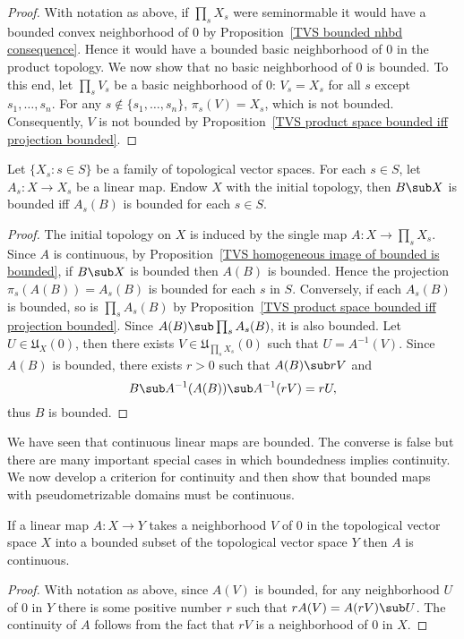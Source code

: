 \begin{proof}
With notation as above, if $\prod_sX_s$ were seminormable it would have a bounded convex neighborhood of $0$ by Proposition~\ref{TVS bounded nhbd consequence}. Hence it would have a bounded basic neighborhood of $0$ in the product topology. We now show that no basic neighborhood of $0$ is bounded. To this end, let $\prod_sV_s$ be a basic neighborhood of $0$: $V_s=X_s$ for all $s$ except $s_1,\dots,s_n$. For any $s\notin\{s_1,\dots,s_n\}$, $\pi_s(V)=X_s$, which is not bounded. Consequently, $V$ is not bounded by Proposition~\ref{TVS product space bounded iff projection bounded}.
\end{proof}
\begin{proposition}\label{TVS initial topo bounded iff}
Let $\{X_s:s\in S\}$ be a family of topological vector spaces. For each $s\in S$, let $A_s:X\to X_s$ be a linear map. Endow $X$ with the initial topology, then $B\sub X$ is bounded iff $A_s(B)$ is bounded for each $s\in S$.
\end{proposition}
\begin{proof}
The initial topology on $X$ is induced by the single map $A:X\to\prod_sX_s$. Since $A$ is continuous, by Proposition~\ref{TVS homogeneous image of bounded is bounded}, if $B\sub X$ is bounded then $A(B)$ is bounded. Hence the projection $\pi_s(A(B))=A_s(B)$ is bounded for each $s$ in $S$. Conversely, if each $A_s(B)$ is bounded, so is $\prod_sA_s(B)$ by Proposition~\ref{TVS product space bounded iff projection bounded}. Since $A(B)\sub\prod_sA_s(B)$, it is also bounded. Let $U\in\mathfrak{U}_X(0)$, then there exists $V\in\mathfrak{U}_{\prod_sX_s}(0)$ such that $U=A^{-1}(V)$. Since $A(B)$ is bounded, there exists $r>0$ such that $A(B)\sub rV$ and
\[B\sub A^{-1}(A(B))\sub A^{-1}(rV)=rU,\]
thus $B$ is bounded.
\end{proof}
We have seen that continuous linear maps are bounded. The converse is false but there are many important special cases in which boundedness implies continuity. We now develop a criterion for continuity and then show that bounded maps with pseudometrizable domains must be continuous.
\begin{proposition}\label{TVS bounded on a nbhd is continuous}
If a linear map $A:X\to Y$ takes a neighborhood $V$ of $0$ in the topological vector space $X$ into a bounded subset of the topological vector space $Y$ then $A$ is continuous.
\end{proposition}
\begin{proof}
With notation as above, since $A(V)$ is bounded, for any neighborhood $U$ of $0$ in $Y$ there is some positive number $r$ such that $rA(V)=A(rV)\sub U$. The continuity of $A$ follows from the fact that $rV$ is a neighborhood of $0$ in $X$.
\end{proof}
